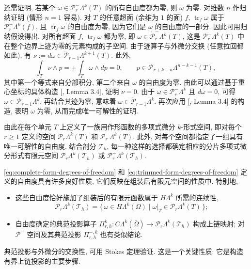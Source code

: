 还需证明, 若某个 $\omega\in\mathcal P_r^-\Lambda^k(T)$ 的所有自由度都为零, 则 $\omega$ 为零. 对维数 $n$ 作归纳证明 (情形 $n=1$ 容易). 对 $T$ 的任意超面 (余维为 $1$ 的面) $f$, $\operatorname{tr}_f\omega$ 属于 $\mathcal P_r^-\Lambda^k(f)$, 且 $\operatorname{tr}_f\omega$ 的自由度为零, 因为它们是 $\omega$ 的自由度的一部分. 因此可用归纳假设得出, 对所有超面 $f$, $\operatorname{tr}_f\omega$ 都为零, 即 $\omega\in\mathring{\mathcal P}_r^-\Lambda^k(T)$, 这是 $\mathcal P_r^-\Lambda^k(T)$ 中在整个边界上迹为零的元素构成的子空间. 由于迹算子与外微分交换 (任意拉回都如此), 有 $\nu:=d\omega\in\mathring{\mathcal P}_{r-1}\Lambda^{k+1}(T)$. 此外,
\[
\int_T\nu\wedge p=\pm\int_T\omega\wedge dp=0,\qquad p\in\mathcal P_{r+k-n}\Lambda^{n-k-1}(T),
\]
其中第一个等式来自分部积分, 第二个来自 $\omega$ 的自由度为零. 由此可以通过基于重心坐标的具体构造 [, Lemma 3.4], 证明 $\nu=0$. 由于 $\omega\in\mathcal P_r^-\Lambda^k$ 且 $d\omega=0$, 可得 $\omega\in\mathcal P_{r-1}\Lambda^k$, 再结合其迹为零, 意味着 $\omega\in\mathring{\mathcal P}_{r-1}\Lambda^k$. 再次应用 [, Lemma 3.4] 的构造, 表明 $\omega$ 为零, 从而完成唯一可解性的证明.

由此在每个单元 $T$ 上定义了一族用作形函数的多项式微分 $k$-形式空间, 即对每个 $r\geq1$ 定义的空间 $\mathcal P_r\Lambda^k(T)$ 和 $\mathcal P_r^-\Lambda^k(T)$. 此外, 对每个空间都指定了一组具有唯一可解性的自由度. 结合剖分 $\mathcal T_h$, 每一种这样的选择都确定相应的分片多项式微分形式有限元空间 $\mathcal P_r\Lambda^k(\mathcal T_h)$ 或 $\mathcal P_r^-\Lambda^k(\mathcal T_h)$.

\eqref{eq:complete-form-degrees-of-freedom} 和 \eqref{eq:trimmed-form-degrees-of-freedom} 定义的自由度具有许多良好性质, 它们反映在组装后有限元空间的性质中. 特别地,
\begin{itemize}
\item{这些自由度恰好施加了组装后的有限元函数属于 $H\Lambda^k$ 所需的连续性,}
\[
\mathcal P_r\Lambda^k(\mathcal T_h)=\{\,\omega\in H\Lambda^k(\Omega)\mid\omega|_T\in\mathcal P_r\Lambda^k(T)\,\};
\]
\item{自由度确定的典范投影算子 $\Pi_{r,h}^k:C\Lambda^k(\bar\Omega)\to\mathcal P_r\Lambda^k(\mathcal T_h)$ 构成上链映射; 对 $\mathcal P^-$ 空间及其典范投影 $\Pi_{r,h}^{-,k}$ 也有类似结论.}
\end{itemize}

典范投影与外微分的交换性, 可用 Stokes 定理验证. 这是一个关键性质: 它是构造有界上链投影的主要步骤.
